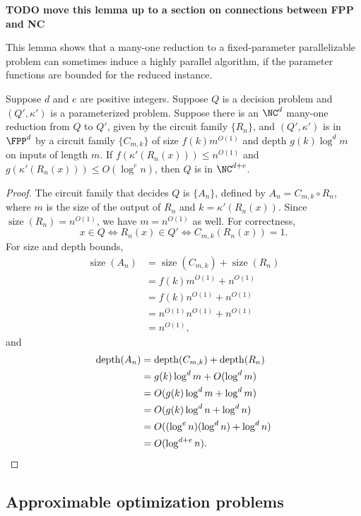 \documentclass{article}
\newcommand{\todo}[1]{\textbf{TODO #1}}
\DeclareMathOperator{\depth}{depth}
\DeclareMathOperator{\size}{size}
\begin{document}
\todo{move this lemma up to a section on connections between FPP and NC}

This lemma shows that a many-one reduction to a fixed-parameter parallelizable problem can sometimes induce a highly parallel algorithm, if the parameter functions are bounded for the reduced instance.

\begin{lemma}\label{lem:reducetonc}
  Suppose $d$ and $e$ are positive integers.
  Suppose $Q$ is a decision problem and $(Q', \kappa')$ is a parameterized problem.
  Suppose there is an $\NC^d$ many-one reduction from $Q$ to $Q'$, given by the circuit family $\{R_n\}$, and $(Q', \kappa')$ is in $\FPP^d$ by a circuit family $\{C_{m, k}\}$ of size $f(k) m^{O(1)}$ and depth $g(k) \log^d m$ on inputs of length $m$.
  If $f(\kappa'(R_n(x))) \leq n^{O(1)}$ and $g(\kappa'(R_n(x))) \leq O(\log^e n)$, then $Q$ is in $\NC^{d + e}$.
\end{lemma}
\begin{proof}
  The circuit family that decides $Q$ is $\{A_n\}$, defined by $A_n = C_{m, k} \circ R_n$, where $m$ is the size of the output of $R_n$ and $k = \kappa'(R_n(x))$.
  Since $\size(R_n) = n^{O(1)}$, we have $m = n^{O(1)}$ as well.
  For correctness,
  \[
  x \in Q \iff R_n(x) \in Q' \iff C_{m, k}(R_n(x)) = 1.
  \]
  For size and depth bounds,
  \begin{align*}
    \size(A_n) & = \size(C_{m, k}) + \size(R_n) \\
    & = f(k) m^{O(1)} + n^{O(1)} \\
    & = f(k) n^{O(1)} + n^{O(1)} \\
    & = n^{O(1)} n^{O(1)} + n^{O(1)} \\
    & = n^{O(1)},
  \end{align*}
  and
  \begin{align*}
    \depth(A_n) & = \depth(C_{m, k}) + \depth(R_n) \\
    & = g(k) \log^d m + O(\log^d m) \\
    & = O(g(k) \log^d m + \log^d m) \\
    & = O(g(k) \log^d n + \log^d n) \\
    & = O((\log^e n) (\log^d n) + \log^d n) \\
    & = O(\log^{d + e} n). \qedhere
  \end{align*}
\end{proof}

\subsection{Approximable optimization problems}
\end{document}
